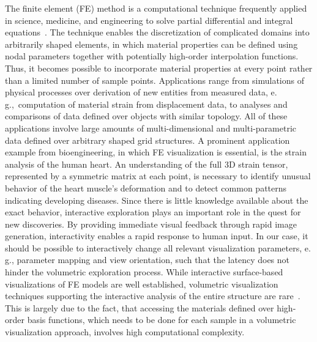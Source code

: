 \documentclass[journal]{vgtc}                %
\begin{document}
The finite element (FE) method is a computational technique frequently applied in science, medicine, and engineering to solve partial differential and integral equations~\cite{Young00}. The technique enables the discretization of complicated domains into arbitrarily shaped elements, in which material properties can be defined using nodal parameters together with potentially high-order interpolation functions. Thus, it becomes possible to incorporate material properties at every point rather than a limited number of sample points. Applications range from simulations of physical processes over derivation of new entities from measured data, e.\,g.,~computation of material strain from displacement data, to analyses and comparisons of data defined over objects with similar topology. All of these applications involve large amounts of multi-dimensional and multi-parametric data defined over arbitrary shaped grid structures. A prominent application example from bioengineering, in which FE visualization is essential, is the strain analysis of the human heart. An understanding of the full 3D strain tensor, represented by a symmetric matrix at each point, is necessary to identify unusual behavior of the heart muscle's deformation and to detect common patterns indicating developing diseases. Since there is little knowledge available about the exact behavior, interactive exploration plays an important role in the quest for new discoveries. By providing immediate visual feedback through rapid image generation, interactivity enables a rapid response to human input. In our case, it should be possible to interactively change all relevant visualization parameters, e.\,g., parameter mapping and view orientation, such that the latency does not hinder the volumetric exploration process. While interactive surface-based visualizations of FE models are well established, volumetric visualization techniques supporting the interactive analysis of the entire structure are rare~\cite{Wihelms90}. This is largely due to the fact, that accessing the materials defined over high-order basis functions, which needs to be done for each sample in a volumetric visualization approach, involves high computational complexity.
\end{document}
